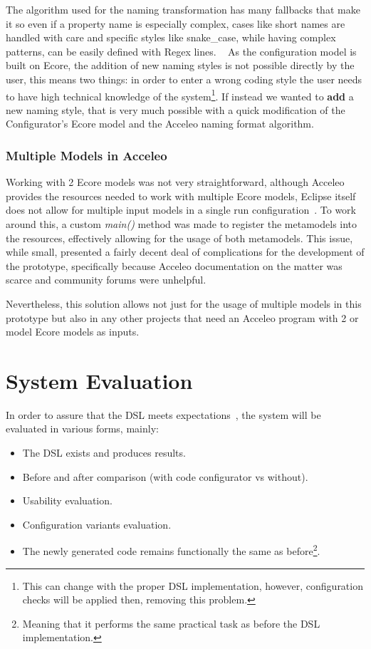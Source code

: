 The algorithm used for the naming transformation has many fallbacks that make it so even if a property name is especially complex, cases like short names are handled with care and specific styles like snake\_case, while having complex patterns, can be easily defined with Regex lines. 
~\cite{eclipse_emf}
As the configuration model is built on Ecore, the addition of new naming styles is not possible directly by the user, this means two things: in order to enter a wrong coding style the user needs to have high technical knowledge of the system\footnote{This can change with the proper DSL implementation, however, configuration checks will be applied then, removing this problem.}. If instead we wanted to \textbf{add} a new naming style, that is very much possible with a quick modification of the Configurator's Ecore model and the Acceleo naming format algorithm.

\subsubsection{Multiple Models in Acceleo}

Working with 2 Ecore models was not very straightforward, although Acceleo provides the resources needed to work with multiple Ecore models, Eclipse itself does not allow for multiple input models in a single run configuration~\cite{acceleo_multi_model_problem}. To work around this, a custom \textit{main()} method was made to register the metamodels into the resources, effectively allowing for the usage of both metamodels. This issue, while small, presented a fairly decent deal of complications for the development of the prototype, specifically because Acceleo documentation on the matter was scarce and community forums were unhelpful.

Nevertheless, this solution allows not just for the usage of multiple models in this prototype but also in any other projects that need an Acceleo program with 2 or model Ecore models as inputs.


\section{System Evaluation}
\label{sec:sys_eval}

In order to assure that the \gls{DSL} meets expectations~\cite{Voelter_Benz_2013}, the system will be evaluated in various forms, mainly:

\begin{itemize}
	\item The \gls{DSL} exists and produces results.
	\item Before and after comparison (with code configurator vs without).
	\item Usability evaluation.
	\item Configuration variants evaluation.
	\item The newly generated code remains functionally the same as before\footnote{Meaning that it performs the same practical task as before the \gls{DSL} implementation.}.
\end{itemize}

